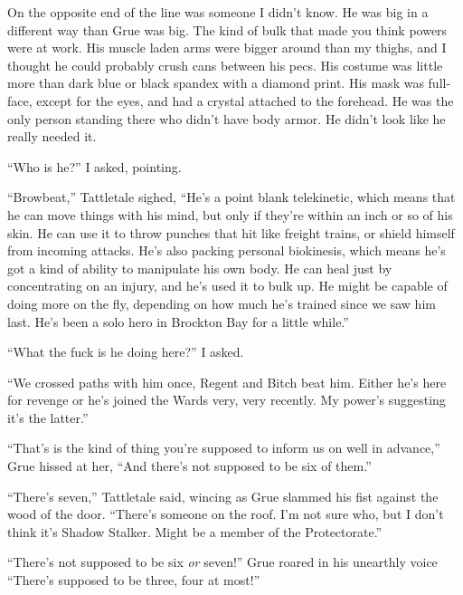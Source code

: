 On the opposite end of the line was someone I didn't know. He was big in a different way than Grue was big. The kind of bulk that made you think powers were at work. His muscle laden arms were bigger around than my thighs, and I thought he could probably crush cans between his pecs. His costume was little more than dark blue or black spandex with a diamond print. His mask was full-face, except for the eyes, and had a crystal attached to the forehead.  He was the only person standing there who didn't have body armor.  He didn't look like he really needed it.



``Who is he?'' I asked, pointing.



``Browbeat,'' Tattletale sighed, ``He's a point blank telekinetic, which means that he can move things with his mind, but only if they're within an inch or so of his skin. He can use it to throw punches that hit like freight trains, or shield himself from incoming attacks. He's also packing personal biokinesis, which means he's got a kind of ability to manipulate his own body. He can heal just by concentrating on an injury, and he's used it to bulk up. He might be capable of doing more on the fly, depending on how much he's trained since we saw him last. He's been a solo hero in Brockton Bay for a little while.''



``What the fuck is he doing here?'' I asked.



``We crossed paths with him once, Regent and Bitch beat him. Either he's here for revenge or he's joined the Wards very, very recently. My power's suggesting it's the latter.''



``That's is the kind of thing you're supposed to inform us on well in advance,'' Grue hissed at her, ``And there's not supposed to be six of them.''



``There's seven,'' Tattletale said, wincing as Grue slammed his fist against the wood of the door. ``There's someone on the roof.  I'm not sure who, but I don't think it's Shadow Stalker. Might be a member of the Protectorate.''



``There's not supposed to be six \emph{or} seven!'' Grue roared in his unearthly voice ``There's supposed to be three, four at most!''




